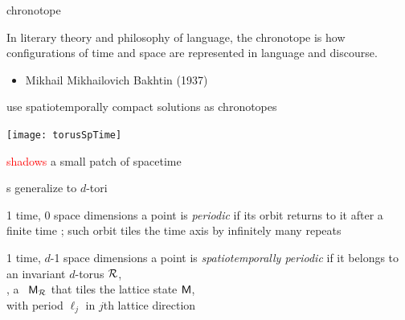 \begin{frame}{chronotope
}
\begin{bartlett}{
In literary theory and philosophy of language, the chronotope is how
configurations of time and space are represented in language and
discourse.
                }
\end{bartlett}

\bigskip
\bigskip

\begin{itemize}
  \item Mikhail Mikhailovich Bakhtin (1937)
\end{itemize}
\end{frame}

\begin{frame}{use spatiotemporally compact solutions as chronotopes}
\begin{center}
\texttt{[image: torusSpTime]}
\end{center}
\textcolor{red}{shadows} a small patch of spacetime
\end{frame}

\begin{frame}{\po s generalize to $d$-tori}

\begin{block}{1 time, 0 space dimensions}
a {\statesp} point is {\em periodic} if its orbit returns to it
after a finite time \period{}; such orbit tiles the time axis
by infinitely many repeats
\end{block}

\bigskip

\begin{block}{1 time, $d$-1 space dimensions}
 a {\statesp} point is {\em spatiotemporally periodic} if
it belongs to \\ an invariant $d$-torus ${\mathcal{R}}$,\\
\ie, a \brick\ $\mathsf{M}_{\mathcal{R}}$ that
tiles the lattice state  $\mathsf{M}$, \\
with period $\ell_j$ in $j$th lattice direction
\end{block}
\end{frame}

